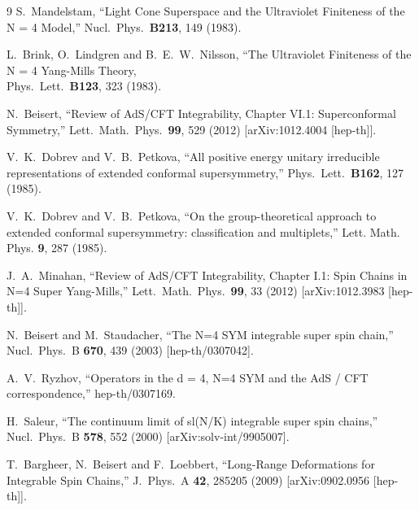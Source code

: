 \documentclass[a4paper,11pt]{article}
\numberwithin{equation}{section}
\begin{document}
\begin{thebibliography} {9}
	S.~Mandelstam,
	``Light Cone Superspace and the Ultraviolet Finiteness of the N = 4 Model,''
	Nucl.\ Phys.\ {\bf B213}, 149 (1983).

	L.~Brink, O.~Lindgren and B.~E.~W.~Nilsson,
	``The Ultraviolet Finiteness of the N = 4 Yang-Mills Theory,\\
	Phys.\ Lett.\ {\bf B123}, 323 (1983).

  N.~Beisert,
  ``Review of AdS/CFT Integrability, Chapter VI.1: Superconformal Symmetry,''
  Lett.\ Math.\ Phys.\  {\bf 99}, 529 (2012)
  [arXiv:1012.4004 [hep-th]].

	V.~K.~Dobrev and V.~B.~Petkova, 
	``All positive energy unitary irreducible representations of extended conformal supersymmetry,''
	Phys.\ Lett.\ {\bf B162}, 127 (1985).

	V.~K.~Dobrev and V.~B.~Petkova,
	``On the group-theoretical approach to extended conformal supersymmetry: classification and multiplets,''
	Lett. Math. Phys. {\bf 9}, 287 (1985).

  J.~A.~Minahan,
  ``Review of AdS/CFT Integrability, Chapter I.1: Spin Chains in N=4 Super Yang-Mills,''
  Lett.\ Math.\ Phys.\  {\bf 99}, 33 (2012)
  [arXiv:1012.3983 [hep-th]].

  N.~Beisert and M.~Staudacher,
  ``The N=4 SYM integrable super spin chain,''
  Nucl.\ Phys.\ B {\bf 670}, 439 (2003)
  [hep-th/0307042].

  A.~V.~Ryzhov,
  ``Operators in the d = 4, N=4 SYM and the AdS / CFT correspondence,''
  hep-th/0307169.

	H.~Saleur, 
	``The continuum limit of sl(N/K) integrable super spin chains,'' 
	Nucl.\ Phys.\ B {\bf 578}, 552 (2000) 
	[arXiv:solv-int/9905007].

  T.~Bargheer, N.~Beisert and F.~Loebbert,
  ``Long-Range Deformations for Integrable Spin Chains,''
  J.\ Phys.\ A {\bf 42}, 285205 (2009)
  [arXiv:0902.0956 [hep-th]].


\end{thebibliography}
\end{document}
